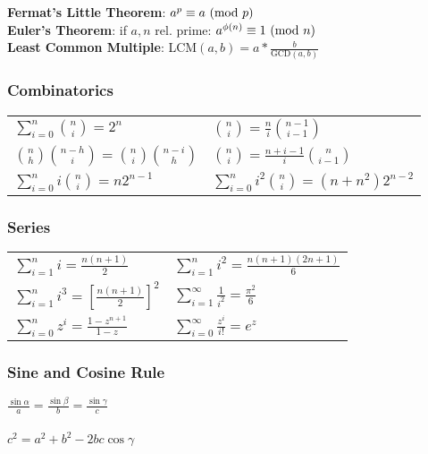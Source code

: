 \textbf{Fermat's Little Theorem}: $a^p\equiv a \ (\mathrm{mod}\ p)$\\
\textbf{Euler's Theorem}: if $a,n$ rel. prime:  $a^{\phi(n)}\equiv 1 \ (\mathrm{mod}\ n)$\\
\textbf{Least Common Multiple}: LCM$(a,b)= a * \frac{b}{\text{GCD}(a,b)}$
		
\subsubsection{Combinatorics}
	\begin{tabular}{l l}
		\vspace{3mm}$\sum_{i=0}^n {n \choose i} = 2^n$ \hspace{2cm} & ${n \choose i} = \frac{n}{i} {n-1 \choose i-1}$ \\
		\vspace{3mm}${n \choose h} {n-h \choose i} = {n \choose i} {n-i \choose h}$ & ${n \choose i} = \frac{n+i-1}{i} {n \choose i-1}$ \\
		\vspace{3mm}$\sum_{i=0}^{n} i{n \choose i} = n 2^{n-1}$ & $\sum_{i=0}^{n} i^2{n \choose i} = (n+n^2)2^{n-2}$ \\
	\end{tabular}
	
		
\subsubsection{Series}
	\begin{tabular}{l l}
		\vspace{3mm}$\sum_{i=1}^n i = \frac{n(n+1)}{2}$ \hspace{2cm} & $\sum_{i=1}^n i^2 = \frac{n(n+1)(2n+1)}{6}$ \\
		\vspace{3mm}$\sum_{i=1}^n i^3 = \left[\frac{n(n+1)}{2}\right]^2$ & $\sum_{i=1}^{\infty}\frac{1}{i^2} = \frac{\pi^2}{6}$ \\
		\vspace{3mm}$\sum_{i=0}^n z^i = \frac{1-z^{n+1}}{1-z}$ & $\sum_{i=0}^\infty \frac{z^i}{i!} = e^z$
	\end{tabular}

\subsubsection{Sine and Cosine Rule}
$\frac{\sin{\alpha}}{a} = \frac{\sin{\beta}}{b} = \frac{\sin{\gamma}}{c}$
\\
\\
$c^2 = a^2 + b^2 - 2bc \cos{\gamma}$